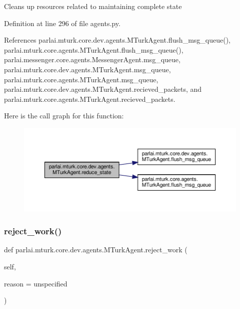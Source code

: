 \begin{DoxyVerb}Cleans up resources related to maintaining complete state\end{DoxyVerb}
 

Definition at line 296 of file agents.\+py.



References parlai.\+mturk.\+core.\+dev.\+agents.\+M\+Turk\+Agent.\+flush\+\_\+msg\+\_\+queue(), parlai.\+mturk.\+core.\+agents.\+M\+Turk\+Agent.\+flush\+\_\+msg\+\_\+queue(), parlai.\+messenger.\+core.\+agents.\+Messenger\+Agent.\+msg\+\_\+queue, parlai.\+mturk.\+core.\+dev.\+agents.\+M\+Turk\+Agent.\+msg\+\_\+queue, parlai.\+mturk.\+core.\+agents.\+M\+Turk\+Agent.\+msg\+\_\+queue, parlai.\+mturk.\+core.\+dev.\+agents.\+M\+Turk\+Agent.\+recieved\+\_\+packets, and parlai.\+mturk.\+core.\+agents.\+M\+Turk\+Agent.\+recieved\+\_\+packets.

Here is the call graph for this function\+:
\nopagebreak
\begin{figure}[H]
\begin{center}
\leavevmode
\includegraphics[width=350pt]{classparlai_1_1mturk_1_1core_1_1dev_1_1agents_1_1MTurkAgent_ade350517a74213389452642c625bc612_cgraph}
\end{center}
\end{figure}
\mbox{\label{classparlai_1_1mturk_1_1core_1_1dev_1_1agents_1_1MTurkAgent_a5f3d74f332376039cd349ab7159e0b4c}} 
\subsubsection{\texorpdfstring{reject\+\_\+work()}{reject\_work()}}
{\footnotesize\ttfamily def parlai.\+mturk.\+core.\+dev.\+agents.\+M\+Turk\+Agent.\+reject\+\_\+work (\begin{DoxyParamCaption}\item[{}]{self,  }\item[{}]{reason = {\ttfamily \textquotesingle{}unspecified\textquotesingle{}} }\end{DoxyParamCaption})}

